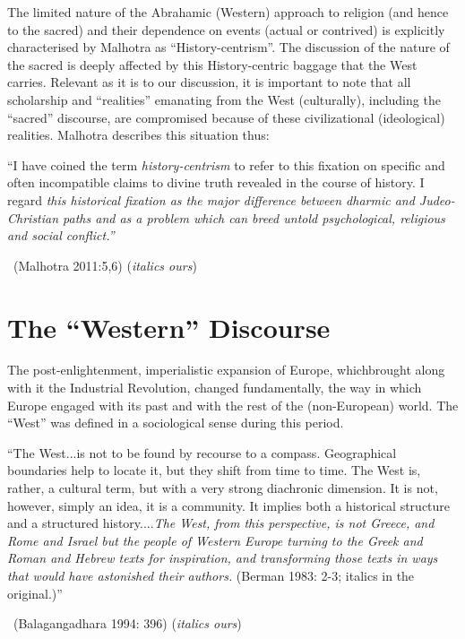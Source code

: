 The limited nature of the Abrahamic (Western) approach to religion (and hence to the sacred) and their dependence on events (actual or contrived) is explicitly characterised by Malhotra as “History-centrism”. The discussion of the nature of the sacred is deeply affected by this History-centric baggage that the West carries. Relevant as it is to our discussion, it is important to note that all scholarship and “realities” emanating from the West (culturally), including the “sacred” discourse, are compromised because of these civilizational (ideological) realities. Malhotra describes this situation thus:

\begin{myquote}
“I have coined the term \textit{history-centrism} to refer to this fixation on specific and often incompatible claims to divine truth revealed in the course of history. I regard \textit{this historical fixation as the major difference between dharmic and Judeo-Christian paths and as a problem which can breed untold psychological, religious and social conflict.”} 

~\hfill (Malhotra 2011:5,6) (\textit{italics ours})
\end{myquote}

\section*{The “Western” Discourse}

The post-enlightenment, imperialistic expansion of Europe, which\break brought along with it the Industrial Revolution, changed fundamentally, the way in which Europe engaged with its past and with the rest of the (non-European) world. The “West” was defined in a sociological sense during this period.

\begin{myquote}
“The West...is not to be found by recourse to a compass. Geographical boundaries help to locate it, but they shift from time to time. The West is, rather, a cultural term, but with a very strong diachronic dimension. It is not, however, simply an idea, it is a community. It implies both a historical structure and a structured history....\textit{The West, from this perspective, is not Greece, and Rome and Israel but the people of Western Europe turning to the Greek and Roman and Hebrew texts for inspiration, and transforming those texts in ways that would have astonished their authors.} (Berman 1983: 2-3; italics in the original.)” 

~\hfill (Balagangadhara 1994: 396) (\textit{italics ours})
\end{myquote}

